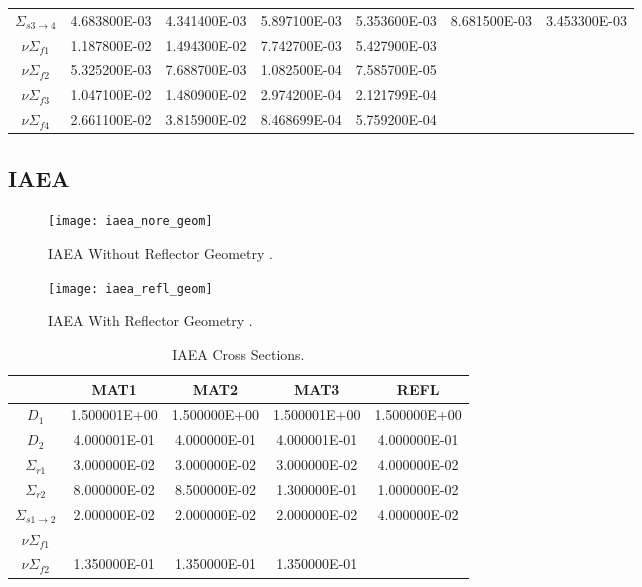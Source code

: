 \begin{table}
\begin{center}
\begin{tabular}{ccccccc}
          $\Sigma_{s 3\rightarrow 4}$&4.683800E-03&4.341400E-03&5.897100E-03&5.353600E-03&8.681500E-03&3.453300E-03\\
          $ \nu \Sigma_{f1}$&1.187800E-02&1.494300E-02&7.742700E-03&5.427900E-03&&\\
          $ \nu \Sigma_{f2}$&5.325200E-03&7.688700E-03&1.082500E-04&7.585700E-05&&\\
          $ \nu \Sigma_{f3}$&1.047100E-02&1.480900E-02&2.974200E-04&2.121799E-04&&\\
          $ \nu \Sigma_{f4}$&2.661100E-02&3.815900E-02&8.468699E-04&5.759200E-04&&\\
          \bottomrule
        \end{tabular}
      \end{center}
    \end{table}
  \subsection{IAEA}
    \begin{figure}
      \centering
      \texttt{[image: iaea\_nore\_geom]}
      \caption{IAEA Without Reflector Geometry \cite{chao}.}
      \label{fig:iaea_nore_geom}
    \end{figure}
    \begin{figure}
      \centering
      \texttt{[image: iaea\_refl\_geom]}
      \caption{IAEA With Reflector Geometry \cite{chao}.}
      \label{fig:iaea_refl_geom}
    \end{figure}
    \begin{table}
      \caption{IAEA Cross Sections.}
      \label{tab:iaeaxs}
      \begin{center}
        \begin{tabular}{ccccc}
          \toprule
          &MAT1&MAT2&MAT3&REFL\\
          \midrule
          $D_1$&1.500001E+00&1.500000E+00&1.500001E+00&1.500000E+00\\
          $D_2$&4.000001E-01&4.000000E-01&4.000001E-01&4.000000E-01\\
          $\Sigma_{r1}$&3.000000E-02&3.000000E-02&3.000000E-02&4.000000E-02\\
          $\Sigma_{r2}$&8.000000E-02&8.500000E-02&1.300000E-01&1.000000E-02\\
          $\Sigma_{s 1\rightarrow 2}$&2.000000E-02&2.000000E-02&2.000000E-02&4.000000E-02\\
          $ \nu \Sigma_{f1}$&&&&\\
          $ \nu \Sigma_{f2}$&1.350000E-01&1.350000E-01&1.350000E-01&\\
          \bottomrule
        \end{tabular}
      \end{center}
    \end{table}

